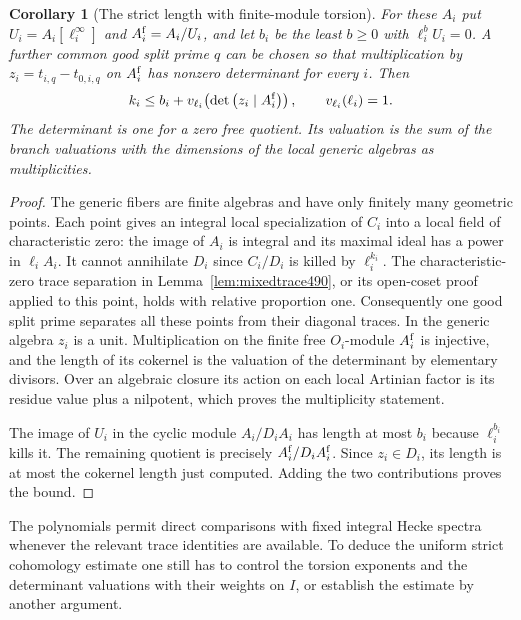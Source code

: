 \documentclass[a4paper,11pt]{article}
\newtheorem{corollary}[proposition]{Corollary}
\theoremstyle{definition}
\theoremstyle{remark}
\numberwithin{equation}{section}
\begin{document}
\begin{corollary}[The strict length with finite-module torsion]\leavevmode
\label{cor:strictvertical499}
For these \(A_i\) put \(U_i=A_i[\ell_i^\infty]\) and
\(A_i^{\rm f}=A_i/U_i\), and let \(b_i\) be the least \(b\ge0\)
with \(\ell_i^bU_i=0\). A further common good split prime \(q\)
can be chosen so that multiplication by
\(z_i=t_{i,q}-t_{0,i,q}\) on \(A_i^{\rm f}\) has nonzero
determinant for every \(i\). Then
\[
 k_i\le b_i+
       v_{\ell_i}\!\left(\det\big(z_i\mid A_i^{\rm f}\big)\right),
             \qquad v_{\ell_i}(\ell_i)=1 .
\]
The determinant is one for a zero free quotient. Its valuation
is the sum of the branch valuations with the dimensions of the
local generic algebras as multiplicities.
\end{corollary}
\begin{proof}
The generic fibers are finite algebras and have only finitely
many geometric points. Each point gives an integral local
specialization of \(C_i\) into a local field of characteristic
zero: the image of \(A_i\) is integral and its maximal ideal
has a power in \(\ell_i A_i\). It cannot annihilate \(D_i\)
since \(C_i/D_i\) is killed by \(\ell_i^{k_i}\). The
characteristic-zero trace separation in
Lemma~\ref{lem:mixedtrace490}, or its open-coset proof applied
to this point, holds with relative proportion one.
Consequently one good split prime separates all these points
from their diagonal traces. In the generic algebra \(z_i\)
is a unit. Multiplication on the finite free \(O_i\)-module
\(A_i^{\rm f}\) is injective, and the length of its cokernel
is the valuation of the determinant by elementary divisors.
Over an algebraic closure its action on each local Artinian
factor is its residue value plus a nilpotent, which proves the
multiplicity statement.

The image of \(U_i\) in the cyclic module \(A_i/D_iA_i\) has
length at most \(b_i\) because \(\ell_i^{b_i}\) kills it.
The remaining quotient is precisely \(A_i^{\rm f}/D_iA_i^{\rm f}\).
Since \(z_i\in D_i\), its length is at most the cokernel length
just computed. Adding the two contributions proves the bound.
\end{proof}
The polynomials permit direct comparisons with fixed integral
Hecke spectra whenever the relevant trace identities are
available. To deduce the uniform strict cohomology estimate
one still has to control the torsion exponents and the
determinant valuations with their weights on \(I\), or establish
the estimate by another argument.
\end{document}
